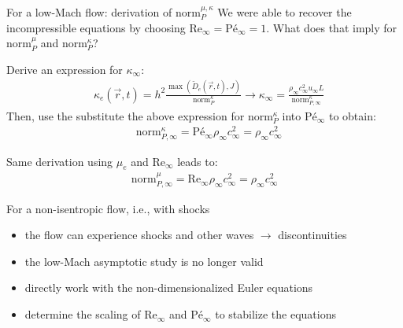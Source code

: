 \documentclass[xcolor=dvipsnames,10pt]{beamer}
\renewcommand{\Re}{\textrm{Re}}
\newcommand{\Pe}{\textrm{P\'e}}
\newcommand{\norm}{\textrm{norm}}
\begin{document}
\begin{frame}{For a low-Mach flow: derivation of $\norm_P^{\mu, \kappa}$ }
We were able to recover the incompressible equations by choosing $\Re_\infty = \Pe_\infty = 1$. What does that imply for $\norm_P^\mu$ and $\norm_P^\kappa$?
\begin{block}{}
Derive an expression for $\kappa_\infty$:
\begin{align}
&\kappa_e(\vec{r},t) = h^2 \frac{\max \left( \tilde{D}_e(\vec{r},t), J \right)}{\norm_P^\kappa} \longrightarrow \kappa_\infty = \frac{ \rho_\infty c_\infty^2 u_\infty L }{ \norm_{P,\infty}^\kappa } \nonumber 
\end{align}
Then, use the substitute the above expression for $\norm_P^\kappa$ into $\Pe_\infty$ to obtain:
\begin{align}
&\norm_{P,\infty}^{\kappa} = \Pe_\infty \rho_\infty c_\infty^2 = \rho_\infty c_\infty^2 \nonumber
\end{align}
\end{block}
\begin{block}{}
Same derivation using $\mu_e$ and $\Re_\infty$ leads to:
\begin{align}
\norm_{P,\infty}^{\mu} = \Re_\infty \rho_\infty c_\infty^2 = \rho_\infty c_\infty^2 \nonumber
\end{align}
\end{block}
\end{frame}
\begin{frame}{For a non-isentropic flow, i.e., with shocks}
\begin{block}{}
\begin{itemize}
\setlength{\itemsep}{10pt}
\item the flow can experience shocks and other waves $\to$ discontinuities
\item the low-Mach asymptotic study is no longer valid
\item directly work with the non-dimensionalized Euler equations
\item determine the scaling of $\Re_\infty$ and $\Pe_\infty$ to stabilize the equations
\end{itemize}
\end{block}
\end{frame}
\end{document}
